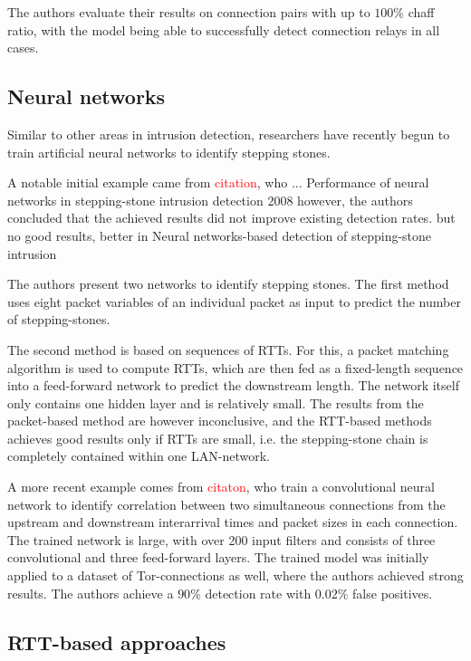 \documentclass[conference]{IEEEtran}\usepackage[]{graphicx}\usepackage[]{color}
\begin{document}
The authors evaluate their results on connection pairs with up to $100\%$ chaff ratio, with the model being able to successfully detect connection relays in all cases. 


\subsection{Neural networks}

Similar to other areas in intrusion detection, researchers have recently begun to train artificial neural networks to identify stepping stones. 

A notable initial example came from \textcolor{red}{citation}, who ...
Performance of neural networks in stepping-stone intrusion detection 2008
however, the authors concluded that the achieved results did not improve existing detection rates. but no good results, better in Neural  networks-based  detection  of stepping-stone  intrusion

The authors present two networks to identify stepping stones. 
The first method uses eight packet variables of an individual packet as input to predict the number of stepping-stones.

The second method is based on sequences of RTTs. For this, a packet matching algorithm is used to compute RTTs, which are then fed as a fixed-length sequence into a feed-forward network to predict the downstream length. The network itself only contains one hidden layer and is relatively small. The results from the packet-based method are however inconclusive, and the RTT-based methods achieves good results only if RTTs are small, i.e. the stepping-stone chain is completely contained within one LAN-network.



A more recent example comes from \textcolor{red}{citaton}, who train a convolutional neural network to identify correlation between two simultaneous connections from the upstream and downstream interarrival times and packet sizes in each connection. The trained network is large, with over 200 input filters and consists of three convolutional and three feed-forward layers. The trained model was initially applied to a dataset of Tor-connections as well, where the authors achieved strong results. 
The authors achieve a $90\%$ detection rate with $0.02 \%$ false positives. 


\subsection{RTT-based approaches}
\end{document}
